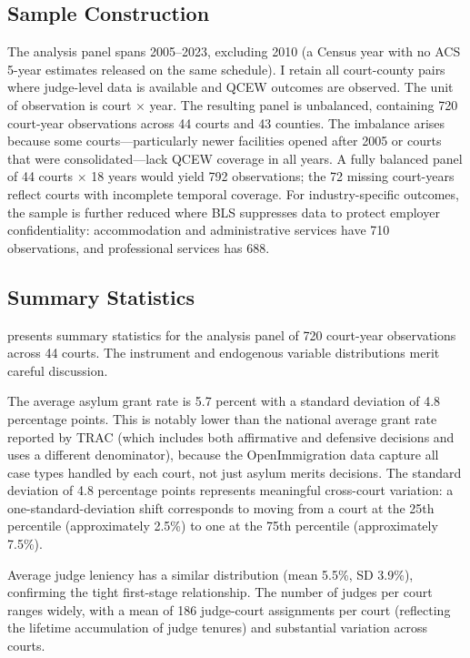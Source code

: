 \documentclass[12pt]{article}
\begin{document}
\subsection{Sample Construction}

The analysis panel spans 2005--2023, excluding 2010 (a Census year with no ACS 5-year estimates released on the same schedule). I retain all court-county pairs where judge-level data is available and QCEW outcomes are observed. The unit of observation is court $\times$ year. The resulting panel is unbalanced, containing 720 court-year observations across 44 courts and 43 counties. The imbalance arises because some courts---particularly newer facilities opened after 2005 or courts that were consolidated---lack QCEW coverage in all years. A fully balanced panel of 44 courts $\times$ 18 years would yield 792 observations; the 72 missing court-years reflect courts with incomplete temporal coverage. For industry-specific outcomes, the sample is further reduced where BLS suppresses data to protect employer confidentiality: accommodation and administrative services have 710 observations, and professional services has 688.

\subsection{Summary Statistics}



 presents summary statistics for the analysis panel of 720 court-year observations across 44 courts. The instrument and endogenous variable distributions merit careful discussion.

The average asylum grant rate is 5.7 percent with a standard deviation of 4.8 percentage points. This is notably lower than the national average grant rate reported by TRAC (which includes both affirmative and defensive decisions and uses a different denominator), because the OpenImmigration data capture all case types handled by each court, not just asylum merits decisions. The standard deviation of 4.8 percentage points represents meaningful cross-court variation: a one-standard-deviation shift corresponds to moving from a court at the 25th percentile (approximately 2.5\%) to one at the 75th percentile (approximately 7.5\%).

Average judge leniency has a similar distribution (mean 5.5\%, SD 3.9\%), confirming the tight first-stage relationship. The number of judges per court ranges widely, with a mean of 186 judge-court assignments per court (reflecting the lifetime accumulation of judge tenures) and substantial variation across courts.
\end{document}

